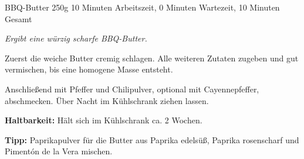 \begin{recipe}{BBQ-Butter} {250g} {10 Minuten Arbeitszeit, 0 Minuten Wartezeit, 10 Minuten Gesamt}

  \freeform{}\textit{Ergibt eine würzig scharfe BBQ-Butter.}


  Zuerst die weiche Butter cremig schlagen.
  Alle weiteren Zutaten zugeben und gut vermischen, bis eine homogene Masse entsteht.


  Anschließend mit Pfeffer und Chilipulver, optional mit Cayennepfeffer, abschmecken.
  Über Nacht im Kühlschrank ziehen lassen.

  \freeform{}\hrulefill{}

  \freeform{}\textbf{Haltbarkeit:}
  Hält sich im Kühlschrank ca. 2 Wochen.

  \freeform{}\textbf{Tipp:}
  Paprikapulver für die Butter aus Paprika edelsüß, Paprika rosenscharf und Pimentón de la Vera mischen.

\end{recipe}
